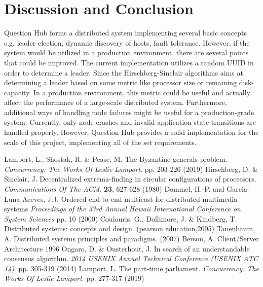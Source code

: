\documentclass[runningheads]{llncs}
\begin{document}
\section{Discussion and Conclusion}

Question Hub forms a distributed system implementing several basic concepts e.g. leader election, dynamic discovery of hosts, fault tolerance.
However, if the system would be utilized in a production environment, there are several points that could be improved. The current implementation utilizes
a random UUID in order to determine a leader. Since the Hirschberg-Sinclair algorithms aims at determining a leader based on some metric like processor size or remaining disk-capacity.
In a production environment, this metric could be useful and actually affect  the performance of a large-scale distributed system. Furthermore, additional ways of handling node failures might be useful for a production-grade system. Currently, only node crashes and invalid application state transitions are handled properly. 
However, Question Hub provides a solid implementation for the scale of this project, implementing all of the set requirements.

\begin{thebibliography}{8}
    Lamport, L., Shostak, R. \& Pease, M. The Byzantine generals problem. {\em Concurrency: The Works Of Leslie Lamport}. pp. 203-226 (2019)
    Hirschberg, D. \& Sinclair, J. Decentralized extrema-finding in circular configurations of processors. {\em Communications Of The ACM}. \textbf{23}, 627-628 (1980)
    Dommel, H.-P. and Garcia-Luna-Aceves, J.J. Ordered end-to-end multicast for distributed multimedia systems {\em Proceedings of the 33rd Annual Hawaii International Conference on System Sciences} pp. 10 (2000)
    Coulouris, G., Dollimore, J. \& Kindberg, T. Distributed systems: concepts and design. (pearson education,2005)
    Tanenbaum, A. Distributed systems principles and paradigms.  (2007)
     Berson, A. Client/Server Architecture 1996
    Ongaro, D. \& Ousterhout, J. In search of an understandable consensus algorithm. {\em 2014 USENIX Annual Technical Conference (USENIX ATC 14)}. pp. 305-319 (2014)
    Lamport, L. The part-time parliament. {\em Concurrency: The Works Of Leslie Lamport}. pp. 277-317 (2019)
\end{thebibliography}
\end{document}
